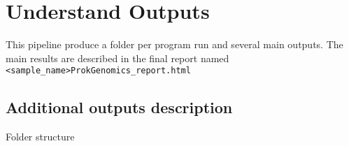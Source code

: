 \documentclass[
]{book}
\begin{document}
\hypertarget{understand-outputs}{%
\chapter{Understand Outputs}\label{understand-outputs}}

This pipeline produce a folder per program run and several main outputs. The main results are described in the final report named \texttt{\textless{}sample\_name\textgreater{}ProkGenomics\_report.html}

\hypertarget{additional-outputs-description}{%
\section{Additional outputs description}\label{additional-outputs-description}}

Folder structure
\end{document}
